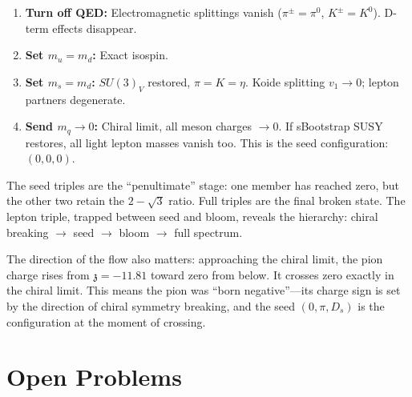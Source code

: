 \documentclass[12pt,a4paper]{article}
\newcommand{\zch}{\mathfrak{z}}
\begin{document}
\begin{enumerate}
\item \textbf{Turn off QED:} Electromagnetic splittings vanish 
($\pi^\pm = \pi^0$, $K^\pm = K^0$). D-term effects disappear.
\item \textbf{Set $m_u = m_d$:} Exact isospin.
\item \textbf{Set $m_s = m_d$:} $SU(3)_V$ restored, 
$\pi = K = \eta$. Koide splitting $v_1 \to 0$; lepton partners 
degenerate.
\item \textbf{Send $m_q \to 0$:} Chiral limit, all meson charges 
$\to 0$. If sBootstrap SUSY restores, all light lepton masses 
vanish too. This is the seed configuration: $(0, 0, 0)$.
\end{enumerate}

The seed triples are the ``penultimate'' stage: one member has 
reached zero, but the other two retain the $2 - \sqrt{3}$ ratio. 
Full triples are the final broken state. The lepton triple, 
trapped between seed and bloom, reveals the hierarchy: 
chiral breaking $\to$ seed $\to$ bloom $\to$ full spectrum.

The direction of the flow also matters: approaching the chiral 
limit, the pion charge rises from $\zch = -11.81$ toward zero 
from below. It crosses zero exactly in the chiral limit. This 
means the pion was ``born negative''---its charge sign is set by 
the direction of chiral symmetry breaking, and the seed 
$(0, \pi, D_s)$ is the configuration at the moment of crossing.

\section{Open Problems}
\label{sec:open}
\end{document}
